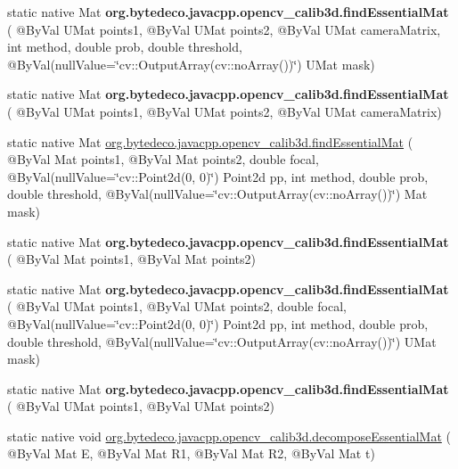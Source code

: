 \begin{DoxyCompactItemize}
\item 
\mbox{\label{group__calib3d_ga4849fceb2741d87f1cd8ebafce6a2be6}} 
static native Mat {\bfseries org.\+bytedeco.\+javacpp.\+opencv\+\_\+calib3d.\+find\+Essential\+Mat} ( @By\+Val U\+Mat points1, @By\+Val U\+Mat points2, @By\+Val U\+Mat camera\+Matrix, int method, double prob, double threshold, @By\+Val(null\+Value=\char`\"{}cv\+::\+Output\+Array(cv\+::no\+Array())\char`\"{}) U\+Mat mask)
\item 
\mbox{\label{group__calib3d_gae83045fa60b7e1fa99f4e9e5313703c4}} 
static native Mat {\bfseries org.\+bytedeco.\+javacpp.\+opencv\+\_\+calib3d.\+find\+Essential\+Mat} ( @By\+Val U\+Mat points1, @By\+Val U\+Mat points2, @By\+Val U\+Mat camera\+Matrix)
\item 
static native Mat \hyperlink{group__calib3d_gad36d1e3d84d08813292f71bad120f252}{org.\+bytedeco.\+javacpp.\+opencv\+\_\+calib3d.\+find\+Essential\+Mat} ( @By\+Val Mat points1, @By\+Val Mat points2, double focal, @By\+Val(null\+Value=\char`\"{}cv\+::\+Point2d(0, 0)\char`\"{}) Point2d pp, int method, double prob, double threshold, @By\+Val(null\+Value=\char`\"{}cv\+::\+Output\+Array(cv\+::no\+Array())\char`\"{}) Mat mask)
\item 
\mbox{\label{group__calib3d_ga957da7f376f227b7cdd2f1a72365cbe1}} 
static native Mat {\bfseries org.\+bytedeco.\+javacpp.\+opencv\+\_\+calib3d.\+find\+Essential\+Mat} ( @By\+Val Mat points1, @By\+Val Mat points2)
\item 
\mbox{\label{group__calib3d_gae778255c4831f4e77bb8152d563da762}} 
static native Mat {\bfseries org.\+bytedeco.\+javacpp.\+opencv\+\_\+calib3d.\+find\+Essential\+Mat} ( @By\+Val U\+Mat points1, @By\+Val U\+Mat points2, double focal, @By\+Val(null\+Value=\char`\"{}cv\+::\+Point2d(0, 0)\char`\"{}) Point2d pp, int method, double prob, double threshold, @By\+Val(null\+Value=\char`\"{}cv\+::\+Output\+Array(cv\+::no\+Array())\char`\"{}) U\+Mat mask)
\item 
\mbox{\label{group__calib3d_gaad2bff5e4a0609446db73eab300a93a0}} 
static native Mat {\bfseries org.\+bytedeco.\+javacpp.\+opencv\+\_\+calib3d.\+find\+Essential\+Mat} ( @By\+Val U\+Mat points1, @By\+Val U\+Mat points2)
\item 
static native void \hyperlink{group__calib3d_ga314b8ffe22b285bacf23b671e27d4495}{org.\+bytedeco.\+javacpp.\+opencv\+\_\+calib3d.\+decompose\+Essential\+Mat} ( @By\+Val Mat E, @By\+Val Mat R1, @By\+Val Mat R2, @By\+Val Mat t)

\end{DoxyCompactItemize}
